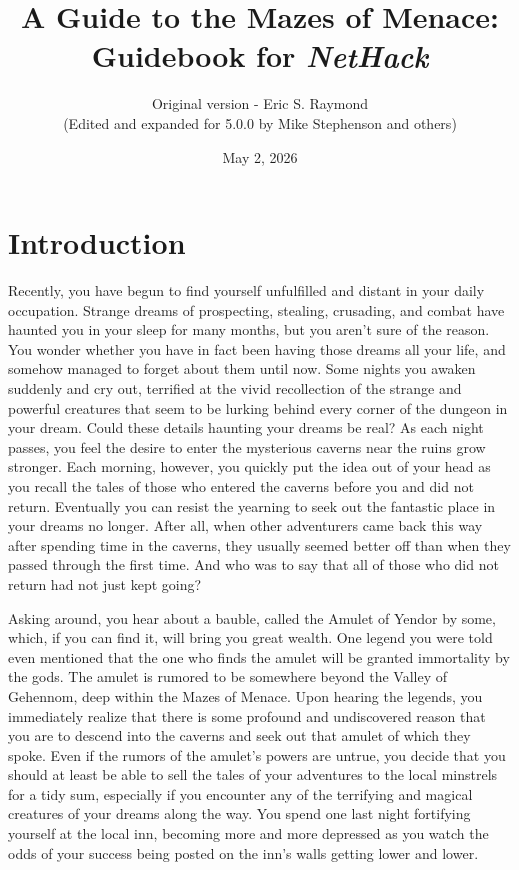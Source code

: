 \documentclass[titlepage]{article}
\begin{document}
%
%

\title{\LARGE A Guide to the Mazes of Menace:\\
\Large Guidebook for \textit{NetHack}}

\author{Original version - Eric S. Raymond\\
(Edited and expanded for 5.0.0 by Mike Stephenson and others)}
\date{May 2, 2026}

\maketitle

\section{Introduction}


Recently, you have begun to find yourself unfulfilled and distant
in your daily occupation.  Strange dreams of prospecting, stealing,
crusading, and combat have haunted you in your sleep for many months,
but you aren't sure of the reason.  You wonder whether you have in
fact been having those dreams all your life, and somehow managed to
forget about them until now.  Some nights you awaken suddenly
and cry out, terrified at the vivid recollection of the strange and
powerful creatures that seem to be lurking behind every corner of the
dungeon in your dream.  Could these details haunting your dreams be real?
As each night passes, you feel the desire to enter the mysterious caverns
near the ruins grow stronger.  Each morning, however, you quickly put
the idea out of your head as you recall the tales of those who entered
the caverns before you and did not return.  Eventually you can resist
the yearning to seek out the fantastic place in your dreams no longer.
After all, when other adventurers came back this way after spending time
in the caverns, they usually seemed better off than when they passed
through the first time.  And who was to say that all of those who did
not return had not just kept going?

Asking around, you hear about a bauble, called the Amulet of Yendor by some,
which, if you can find it, will bring you great wealth.  One legend you were
told even mentioned that the one who finds the amulet will be granted
immortality by the gods.  The amulet is rumored to be somewhere beyond the
Valley of Gehennom, deep within the Mazes of Menace.  Upon hearing the
legends, you immediately realize that there is some profound and
undiscovered reason that you are to descend into the caverns and seek
out that amulet of which they spoke.  Even if the rumors of the amulet's
powers are untrue, you decide that you should at least be able to sell the
tales of your adventures to the local minstrels for a tidy sum, especially
if you encounter any of the terrifying and magical creatures of
your dreams along the way.  You spend one last night fortifying yourself
at the local inn, becoming more and more depressed as you watch the odds
of your success being posted on the inn's walls getting lower and lower.
\end{document}
